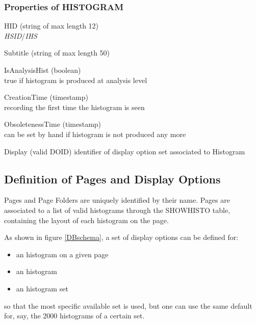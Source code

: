 \documentclass{lhcbnote}
\begin{document}
\subsubsection{Properties of HISTOGRAM}
\begin{description}
\item{HID} (string of max length 12)\\
{\it HSID}/{\it IHS}
\item{Subtitle} (string of max length 50)\\
\item{IsAnalysisHist} (boolean)\\
true if histogram is produced at analysis level
\item{CreationTime} (timestamp)\\
recording the first time the histogram is seen
\item{ObsoletenessTime} (timestamp)\\
can be set by hand if histogram is not produced any more 
\item{Display} (valid DOID)
identifier of display option set associated to Histogram 
\end{description}

\subsection{Definition of Pages and Display Options}
Pages and Page Folders are uniquely identified by their name. Pages
are associated to a list of valid histograms through the SHOWHISTO
table, containing the layout of each histogram on the page.

 As shown in figure \ref{DBschema}, a set of display options can
be defined for:
\begin{itemize}
\item an histogram on a given page
\item an histogram
\item an histogram set
\end{itemize}
so that the most specific available set is used, but one can use the
same default for, say, the 2000 histograms of a certain set. 
\end{document}
